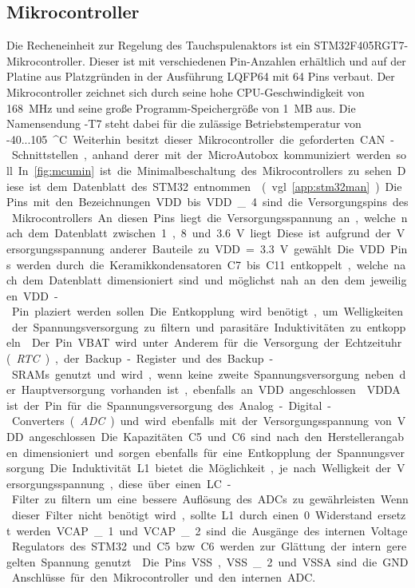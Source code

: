 \subsection{Mikrocontroller}\label{sec:mcu_kap4}
Die Recheneinheit zur Regelung des Tauchspulenaktors ist ein STM32F405RGT7-Mikrocontroller. Dieser ist mit verschiedenen Pin-Anzahlen erhältlich und auf der Platine aus Platzgründen in der Ausführung LQFP64 mit 64 Pins verbaut. Der Mikrocontroller zeichnet sich durch seine hohe CPU-Geschwindigkeit von \SI{168}{MHz} und seine große Programm-Speichergröße von \SI{1}{MB} aus. Die Namensendung -T7 steht dabei für die zulässige Betriebstemperatur von -40...\SI{105}{^\circ C}. Weiterhin besitzt dieser Mikrocontroller die geforderten CAN-Schnittstellen, anhand derer mit der MicroAutobox kommuniziert werden soll. In \autoref{fig:mcumin} ist die Minimalbeschaltung des Mikrocontrollers zu sehen. Diese ist dem Datenblatt des STM32 entnommen \cite[S.77]{stm32} (vgl. \autoref{app:stm32man}). Die Pins mit den Bezeichnungen VDD bis VDD\_4 sind die Versorgungspins des Mikrocontrollers. An diesen Pins liegt die Versorgungsspannung an, welche nach dem Datenblatt zwischen 1,8 und \SI{3,6}{V} liegt. Diese ist aufgrund der Versorgungsspannung anderer Bauteile zu VDD = \SI{3,3}{V} gewählt. Die VDD Pins werden durch die Keramikkondensatoren C7 bis C11 entkoppelt, welche nach dem Datenblatt dimensioniert sind und möglichst nah an den dem jeweiligen VDD-Pin plaziert werden sollen. Die Entkopplung wird benötigt, um Welligkeiten der Spannungsversorgung zu filtern und parasitäre Induktivitäten zu entkoppeln \cite{decoupling}. Der Pin VBAT wird unter Anderem für die Versorgung der Echtzeituhr (\textit{RTC}), der Backup-Register und des Backup-SRAMs genutzt und wird, wenn keine zweite Spannungsversorgung neben der Hauptversorgung vorhanden ist, ebenfalls an VDD angeschlossen \cite[S.31]{stm32}. VDDA ist der Pin für die Spannungsversorgung des Analog-Digital-Converters (\textit{ADC}) und wird ebenfalls mit der Versorgungsspannung von VDD angeschlossen. Die Kapazitäten C5 und C6 sind nach den Herstellerangaben dimensioniert und sorgen ebenfalls für eine Entkopplung der Spannungsversorgung. Die Induktivität L1 bietet die Möglichkeit, je nach Welligkeit der Versorgungsspannung, diese über einen LC-Filter zu filtern um eine bessere Auflösung des ADCs zu gewährleisten. Wenn dieser Filter nicht benötigt wird, sollte L1 durch einen \SI{0}{\Omega} Widerstand ersetzt werden.
VCAP\_1 und VCAP\_2 sind die Ausgänge des internen Voltage Regulators des STM32 und C5 bzw. C6 werden zur Glättung der intern geregelten Spannung genutzt \cite[S.77]{stm32}. Die Pins VSS, VSS\_2 und VSSA sind die GND Anschlüsse für den Mikrocontroller und den internen ADC.
